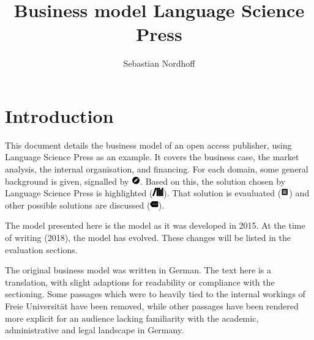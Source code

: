 \documentclass[output=guidelines,nonflat,smallfont,
draftmode
]{langsci/langscibook}
\title{Business model Language Science Press}
\author{Sebastian Nordhoff}
\begin{document}
\maketitle
\tableofcontents
\mainmatter
\chapter{Introduction}
This document details the business model of an open access publisher, using Language Science Press as an example. It covers the
business case,
the market analysis, 
the internal organisation, 
and financing. 
For each domain, some general background is given, signalled by {\color{yellow}\includegraphics[height=1em]{langsci/graphics/explore.pdf}}.
Based on this, the solution chosen by Language Science Press is highlighted ({\color{lsLightBlue}\includegraphics[height=1em]{langsci/graphics/tbls-langsci.pdf}}).
That solution is evauluated ({\color{lsLightOrange}\includegraphics[height=1em]{langsci/graphics/tbls-receipt.pdf}})
and other possible solutions are discussed ({\color{lsDarkGreenOne}\includegraphics[height=1em]{langsci/graphics/tbls-more.pdf}}). 

The model presented here is the model as it was developed in 2015. At the time of writing (2018), the model has evolved. These changes will be listed in the evaluation sections. 

The original business model was written in German. The text here is a translation, with slight adaptions for readability or compliance with the sectioning. Some passages which were to heavily tied to the internal workings of Freie Universität have been removed, while other passages have been rendered more explicit for an audience lacking familiarity with the academic, administrative and legal landscape in Germany. 
\end{document}
